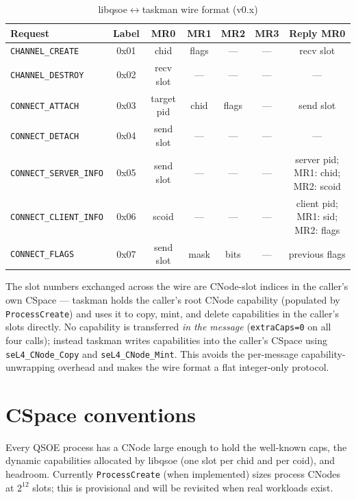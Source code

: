 \begin{table}[ht]
\centering
\small
\begin{tabular}{@{}lcccccc@{}}
    \toprule
    \textbf{Request}      & \textbf{Label} & \textbf{MR0} & \textbf{MR1} & \textbf{MR2} & \textbf{MR3} & \textbf{Reply MR0} \\
    \midrule
    \texttt{CHANNEL\_CREATE}        & 0x01 & chid           & flags   & ---     & --- & recv slot \\
    \texttt{CHANNEL\_DESTROY}       & 0x02 & recv slot      & ---     & ---     & --- & ---       \\
    \texttt{CONNECT\_ATTACH}        & 0x03 & target pid     & chid    & flags   & --- & send slot \\
    \texttt{CONNECT\_DETACH}        & 0x04 & send slot      & ---     & ---     & --- & ---       \\
    \texttt{CONNECT\_SERVER\_INFO}  & 0x05 & send slot      & ---     & ---     & --- & server pid; MR1: chid; MR2: scoid \\
    \texttt{CONNECT\_CLIENT\_INFO}  & 0x06 & scoid          & ---     & ---     & --- & client pid; MR1: sid; MR2: flags \\
    \texttt{CONNECT\_FLAGS}         & 0x07 & send slot      & mask    & bits    & --- & previous flags \\
    \bottomrule
\end{tabular}
\caption{libqsoe$\leftrightarrow$taskman wire format (v0.x)}
\label{tab:wire}
\end{table}

The slot numbers exchanged across the wire are CNode-slot indices in
the caller's own CSpace --- taskman holds the caller's root CNode
capability (populated by \texttt{ProcessCreate}) and uses it to copy,
mint, and delete capabilities in the caller's slots directly.  No
capability is transferred \emph{in the message} (\texttt{extraCaps=0}
on all four calls); instead taskman writes capabilities into the
caller's CSpace using \texttt{seL4\_CNode\_Copy} and
\texttt{seL4\_CNode\_Mint}.  This avoids the per-message capability-
unwrapping overhead and makes the wire format a flat integer-only
protocol.

\section{CSpace conventions}
\label{sec:cspace-conventions}

Every QSOE process has a CNode large enough to hold the well-known
caps, the dynamic capabilities allocated by libqsoe (one slot per chid
and per coid), and headroom.  Currently \texttt{ProcessCreate} (when
implemented) sizes process CNodes at $2^{12}$ slots; this is
provisional and will be revisited when real workloads exist.

